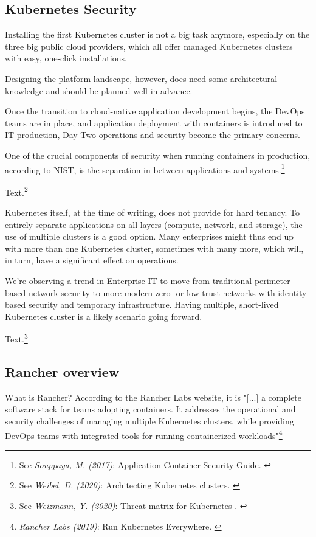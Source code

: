 \subsection{Kubernetes Security}

Installing the first Kubernetes cluster is not a big task anymore, especially on the three big public cloud providers, which all offer managed Kubernetes clusters with easy, one-click installations.

Designing the platform landscape, however, does need some architectural knowledge and should be planned well in advance.

Once the transition to cloud-native application development begins, the DevOps teams are in place, and application deployment with containers is introduced to IT production, Day Two operations and security become the primary concerns.

One of the crucial components of security when running containers in production, according to NIST, is the separation in between applications and systems.\footnote{See \textit{Souppaya, M. (2017)}: Application Container Security Guide. \cite{sp800-190}}

Text.\footnote{See \textit{Weibel, D. (2020)}: Architecting Kubernetes clusters. \cite{howMany}}

Kubernetes itself, at the time of writing, does not provide for hard tenancy. To entirely separate applications on all layers (compute, network, and storage), the use of multiple clusters is a good option. Many enterprises might thus end up with more than one Kubernetes cluster, sometimes with many more, which will, in turn, have a significant effect on operations.

We're observing a trend in Enterprise IT to move from traditional perimeter-based network security to more modern zero- or low-trust networks with identity-based security and temporary infrastructure. Having multiple, short-lived Kubernetes cluster is a likely scenario going forward.

Text.\footnote{See \textit{Weizmann, Y. (2020)}: Threat matrix for Kubernetes . \cite{threatMatrix}}

\subsection{Rancher overview}

What is Rancher? According to the Rancher Labs website, it is "[...] a complete software stack for teams adopting containers. It addresses the operational and security challenges of managing multiple Kubernetes clusters, while providing DevOps teams with integrated tools for running containerized workloads"\footnote{\textit{Rancher Labs (2019)}: Run Kubernetes Everywhere. \cite{rancher}}

